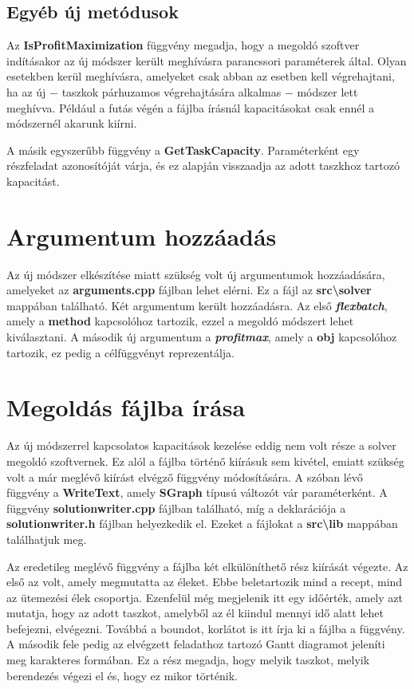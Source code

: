 \subsection{Egyéb új metódusok}
Az \textbf{IsProfitMaximization} függvény megadja, hogy a megoldó szoftver indításakor az új módszer került meghívásra parancssori paraméterek által. Olyan esetekben kerül meghívásra, amelyeket csak abban az esetben kell végrehajtani, ha az új $-$ taszkok párhuzamos végrehajtására alkalmas $-$ módszer lett meghívva. Például a futás végén a fájlba írásnál kapacitásokat csak ennél a módszernél akarunk kiírni.

A másik egyszerűbb függvény a \textbf{GetTaskCapacity}. Paraméterként egy részfeladat azonosítóját várja, és ez alapján visszaadja az adott taszkhoz tartozó kapacitást.

\section{Argumentum hozzáadás}
Az új módszer elkészítése miatt szükség volt új argumentumok hozzáadására, amelyeket az \textbf{arguments.cpp} fájlban lehet elérni. Ez a fájl az \textbf{src\textbackslash solver} mappában található. Két argumentum került hozzáadásra. Az első \textbf{\textit{flexbatch}}, amely a \textbf{method} kapcsolóhoz tartozik, ezzel a megoldó módszert lehet kiválasztani. A második új argumentum a \textbf{\textit{profit\textunderscore max}}, amely a \textbf{obj} kapcsolóhoz tartozik, ez pedig a célfüggvényt reprezentálja.

\section{Megoldás fájlba írása}
Az új módszerrel kapcsolatos kapacitások kezelése eddig nem volt része a solver megoldó szoftvernek. Ez alól a fájlba történő kiírásuk sem kivétel, emiatt szükség volt a már meglévő kiírást elvégző függvény módosítására. A szóban lévő függvény a \textbf{WriteText}, amely \textbf{SGraph} típusú változót vár paraméterként. A függvény \textbf{solutionwriter.cpp} fájlban található, míg a deklarációja a \textbf{solutionwriter.h} fájlban helyezkedik el. Ezeket a fájlokat a \textbf{src\textbackslash lib} mappában találhatjuk meg. 

Az eredetileg meglévő függvény a fájlba két elkülöníthető rész kiírását végezte. Az első az volt, amely megmutatta az éleket. Ebbe beletartozik mind a recept, mind az ütemezési élek csoportja. Ezenfelül még megjelenik itt egy időérték, amely azt mutatja, hogy az adott taszkot, amelyből az él kiindul mennyi idő alatt lehet befejezni, elvégezni. Továbbá a boundot, korlátot is itt írja ki a fájlba a függvény. A második fele pedig az elvégzett feladathoz tartozó Gantt diagramot jeleníti meg karakteres formában. Ez a rész megadja, hogy melyik taszkot, melyik berendezés végezi el és, hogy ez mikor történik.

